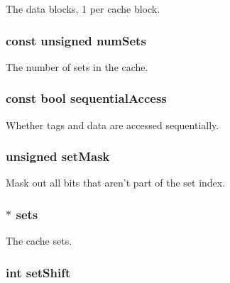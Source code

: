 The data blocks, 1 per cache block. \hypertarget{classLRU_a5fd82580355559fd0c858de6292f3bb7}{
\subsubsection[{numSets}]{\setlength{\rightskip}{0pt plus 5cm}const unsigned {\bf numSets}}}
\label{classLRU_a5fd82580355559fd0c858de6292f3bb7}
The number of sets in the cache. \hypertarget{classLRU_abcad7d1df4609a3182779b57fc4120ac}{
\subsubsection[{sequentialAccess}]{\setlength{\rightskip}{0pt plus 5cm}const bool {\bf sequentialAccess}}}
\label{classLRU_abcad7d1df4609a3182779b57fc4120ac}
Whether tags and data are accessed sequentially. \hypertarget{classLRU_aaac2f20338ad5e01ac8e2354606777ea}{
\subsubsection[{setMask}]{\setlength{\rightskip}{0pt plus 5cm}unsigned {\bf setMask}}}
\label{classLRU_aaac2f20338ad5e01ac8e2354606777ea}
Mask out all bits that aren't part of the set index. \hypertarget{classLRU_af644b16f4706597c8192621b8c58e2ed}{
\subsubsection[{sets}]{$\ast$ {\bf sets}}}
\label{classLRU_af644b16f4706597c8192621b8c58e2ed}
The cache sets. \hypertarget{classLRU_a836015c10ab05e1e7c4be79579a50730}{
\subsubsection[{setShift}]{\setlength{\rightskip}{0pt plus 5cm}int {\bf setShift}}}
